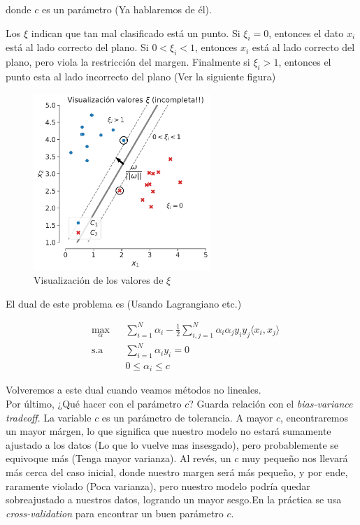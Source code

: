 donde $c$ es un parámetro (Ya hablaremos de él).

Los $\xi$ indican que tan mal clasificado está un punto. Si $\xi_i = 0$, entonces el dato $x_i$ está al lado correcto del plano. Si $0<\xi_i <1$, entonces $x_i$ está al lado correcto del plano, pero viola la restricción del margen. Finalmente si $\xi_i>1$, entonces el punto esta al lado incorrecto del plano (Ver la siguiente figura)

\begin{figure}[ht]
    \centering
    \includegraphics[width=0.6\textwidth]{img/cap5_max_margen3}
    \caption{Visualización de los valores de $\xi$}
    \label{fig:my_label4}
\end{figure}

El dual de este problema es (Usando Lagrangiano etc.)

\begin{equation*}
\begin{aligned}
& \underset{\alpha}{\text{max}}
& & \sum\limits_{i=1}^{N}\alpha_i - \frac{1}{2} \sum\limits_{i,j=1}^{N} \alpha_i \alpha_j y_i y_j \langle x_i, x_j\rangle\\
& \text{s.a}
& & \sum\limits_{i=1}^{N} \alpha_i y_i= 0 \\
& &  &0 \leq \alpha_i \leq c
\end{aligned}
\end{equation*}

Volveremos a este dual cuando veamos métodos no lineales. 
\\

Por último, ¿Qué hacer con el parámetro $c$? Guarda relación con el \textit{bias-variance tradeoff}. La variable $c$ es un parámetro de tolerancia. A mayor $c$, encontraremos un mayor márgen, lo que significa que nuestro modelo no estará sumamente ajustado a los datos (Lo que lo vuelve mas insesgado), pero probablemente se equivoque más (Tenga mayor varianza). Al revés, un $c$ muy pequeño nos llevará más cerca del caso inicial, donde nuestro margen será más pequeño, y por ende, raramente violado (Poca varianza), pero nuestro modelo podría quedar sobreajustado a nuestros datos, logrando un mayor sesgo.En la práctica se usa \textit{cross-validation} para encontrar un buen parámetro $c$.  


